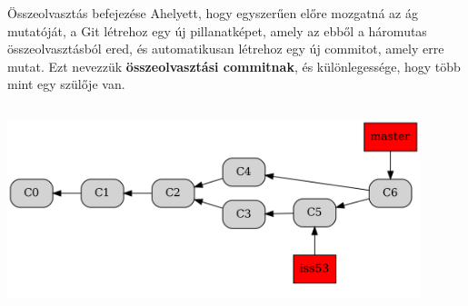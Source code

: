 \documentclass[english, aspectratio=169]{beamer}
\begin{document}
	\begin{frame}{Összeolvasztás befejezése}
		Ahelyett, hogy egyszerűen előre mozgatná az ág mutatóját, a Git létrehoz egy új pillanatképet, amely az ebből a háromutas összeolvasztásból ered, és automatikusan létrehoz egy új commitot, amely erre mutat. Ezt nevezzük \textbf{összeolvasztási commitnak}, és különlegessége, hogy több mint egy szülője van.
		\begin{center}
			\includegraphics[height=6cm, width=12cm, keepaspectratio]{graphs/git_17.png}
		\end{center}
	\end{frame}
	
\end{document}
